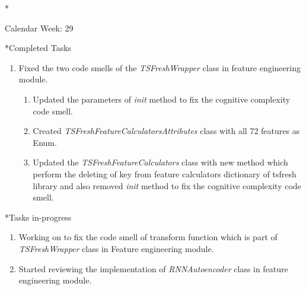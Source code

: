 \documentclass[11pt,a4paper]{article}
\begin{document}
\newpage
\begin{section}*{Calendar Week: 29 \hfill \date{23 July, 2021}}
 \begin{subsection}*{Completed Tasks}
     \begin{enumerate}
         \item Fixed the two code smells of the \textit{TSFreshWrapper} class in feature engineering module.
               \begin{enumerate}
                   \item Updated the parameters of \textit{init} method to fix the cognitive complexity code smell.
                   \item Created \textit{TSFreshFeatureCalculatorsAttributes} class with all 72 features as Enum.
                   \item Updated the \textit{TSFreshFeatureCalculators} class with new method which perform the deleting of key from feature calculators dictionary of tsfresh library and also removed \textit{init} method to fix the cognitive complexity code smell.
               \end{enumerate}
     \end{enumerate}
 \end{subsection}
 \begin{subsection}*{Tasks in-progress}
     \begin{enumerate}
         \item Working on to fix the code smell of transform function which is part of \textit{TSFreshWrapper} class in Feature engineering module.
         \item Started reviewing the implementation of \textit{RNNAutoencoder} class in feature engineering module.
     \end{enumerate}
 \end{subsection}
\end{section}
\end{document}
